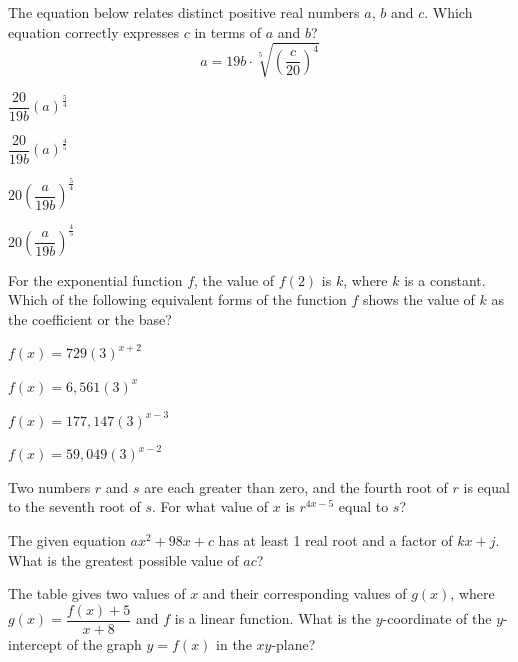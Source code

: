 \vfill
\clearpage
\noindent\begin{minipage}{\linewidth}
\par\smallskip
The equation below relates distinct positive real numbers $a$, $b$ and $c$. Which equation correctly expresses $c$ in terms of $a$ and $b$? $$a=19b\cdot\sqrt[5]{\left(\frac{c}{20}\right)^4}$$
\begin{satchoices}
  \item[A)] $\dfrac{20}{19b}(a)^{\frac{5}{4}}$
  \item[B)] $\dfrac{20}{19b}(a)^{\frac{4}{5}}$
  \item[C)] $20\left(\dfrac{a}{19b}\right)^{\frac{5}{4}}$
  \item[D)] $20\left(\dfrac{a}{19b}\right)^{\frac{4}{5}}$
\end{satchoices}
\end{minipage}
\vfill
\noindent\begin{minipage}{\linewidth}
\par\smallskip
For the exponential function $f$, the value of $f(2)$ is $k$, where $k$ is a constant. Which of the following equivalent forms of the function $f$ shows the value of $k$ as the coefficient or the base?
\begin{satchoices}
  \item[A)] $f(x)=729(3)^{x+2}$
  \item[B)] $f(x)=6{,}561(3)^x$
  \item[C)] $f(x)=177{,}147(3)^{x-3}$
  \item[D)] $f(x)=59{,}049(3)^{x-2}$
\end{satchoices}
\end{minipage}
\vfill
\noindent\begin{minipage}{\linewidth}
\par\smallskip
Two numbers $r$ and $s$ are each greater than zero, and the fourth root of $r$ is equal to the seventh root of $s$. For what value of $x$ is $r^{4x-5}$ equal to $s$?
\end{minipage}
\vfill
\clearpage
\noindent\begin{minipage}{\linewidth}
\par\smallskip
The given equation $ax^2+98x+c$ has at least 1 real root and a factor of $kx+j$. What is the greatest possible value of $ac$?
\end{minipage}
\vfill
\noindent\begin{minipage}{\linewidth}
\par\smallskip
The table gives two values of $x$ and their corresponding values of $g(x)$, where $g(x)=\dfrac{f(x)+5}{x+8}$ and $f$ is a linear function. What is the $y$-coordinate of the $y$-intercept of the graph $y=f(x)$ in the $xy$-plane?
\satfig{\figtblgx}
\end{minipage}
